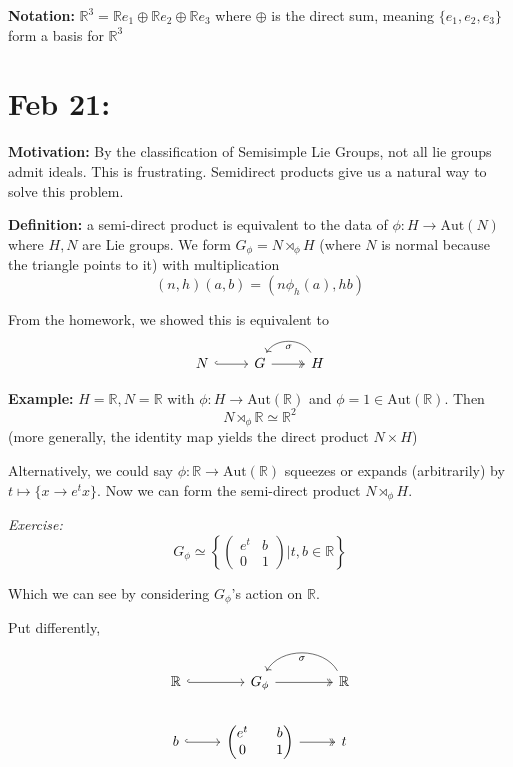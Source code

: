 \documentclass[12pt]{article}
\newcommand{\R}{\mathbb{R}}
\newcommand{\Aut}{\text{Aut}}
\begin{document}
    \textbf{Notation:} $\R^3 = \R e_1 \oplus \R e_2 \oplus \R e_3$ where $\oplus$ is the direct sum, meaning $\{e_1, e_2, e_3\}$ form a basis for $\R^3$ 

\section{Feb 21:}
    \textbf{Motivation:} By the classification of Semisimple Lie Groups, not all lie groups admit ideals. This is frustrating. Semidirect products give us a natural way to solve this problem. 

    \textbf{Definition:} a semi-direct product is equivalent to the data of $\phi: H \to \Aut(N)$ where $H, N$ are Lie groups. We form $G_{\phi} = N \rtimes_{\phi} H$ (where $N$ is normal because the triangle points to it) with multiplication 
    \[(n, h)(a, b) = (n \phi_h(a), hb)\]

    From the homework, we showed this is equivalent to 
    \[\begin{tikzcd}
        N \arrow[hook]{r} & G \arrow[two heads]{r} & H \arrow[bend right=60]{l}{\sigma}
    \end{tikzcd}\]

    \textbf{Example:} $H = \R, N = \R$ with $\phi: H \to \Aut(\R)$ and $\phi = 1 \in \Aut(\R)$. Then 
    \[N \rtimes_{\phi} \R \simeq \R^2\] 
    (more generally, the identity map yields the direct product $N \times H$) 

    Alternatively, we could say $\phi: \R \to \Aut(\R)$ squeezes or expands (arbitrarily) by $t \mapsto \{x \to e^t x\}$. Now we can form the semi-direct product $N \rtimes_{\phi} H$. 

    \emph{Exercise:}
    \[G_{\phi} \simeq \left\{\begin{pmatrix}
        e^t & b\\ 
        0 & 1
    \end{pmatrix} \bigg\vert t, b \in \R\right\}\]

    Which we can see by considering $G_{\phi}$'s action on $\R$. 

    Put differently, 
    \[\begin{tikzcd}
        \R \arrow[hook]{r} & G_{\phi} \arrow[two heads]{r} & \R \arrow[bend right=60]{l}{\sigma}\\ 
        b \arrow[hook]{r} & \begin{pmatrix}
            e^t & b\\ 
            0 & 1
        \end{pmatrix} \arrow[two heads]{r} & t
    \end{tikzcd}\]
\end{document}
